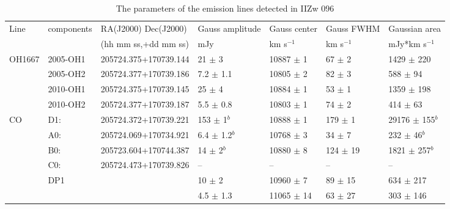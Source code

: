 \documentclass[]{aa} %
\newcommand{\kms}{km s$^{-1}$\xspace}
\begin{document}
\begin{table*}
\small
\caption{The parameters of the emission lines detected in IIZw 096}
\label{allline}
\begin{tabular}{lllllll}

\hline\hline
Line & components & RA(J2000)  Dec(J2000)       & Gauss amplitude   & Gauss center      & Gauss FWHM       & Gaussian area       \\
 &            & (hh mm ss,+dd mm ss)        & mJy               & \kms              & \kms             & mJy*\kms       \\
  \hline
OH1667
 & 2005-OH1   & 205724.375+170739.144  &  21 $\pm$ 3     & 10887 $\pm$ 1   & 67 $\pm$ 2     & 1429 $\pm$ 220      \\
 & 2005-OH2   & 205724.377+170739.186  &  7.2 $\pm$ 1.1     & 10805 $\pm$ 2  & 82 $\pm$ 3    & 588 $\pm$ 94     \\
 & 2010-OH1   & 205724.375+170739.145  &  25 $\pm$ 4     & 10884 $\pm$ 1   & 53 $\pm$ 1    & 1359 $\pm$ 198     \\
 & 2010-OH2   & 205724.377+170739.187  &  5.5 $\pm$ 0.8     & 10803 $\pm$ 1  & 74 $\pm$ 2    & 414 $\pm$ 63     \\
  \hline
CO
& D1:          & 205724.372+170739.221  & 153 $\pm$ 1$^{b}$    & 10888 $\pm$ 1    & 179 $\pm$ 1    & 29176 $\pm$ 155$^{b}$   \\
&A0:           & 205724.069+170734.921  & 6.4 $\pm$ 1.2$^{b}$    & 10768 $\pm$ 3    & 34 $\pm$ 7    & 232 $\pm$ 46$^{b}$    \\
&B0:           & 205723.604+170744.387  & 14 $\pm$ 2$^{b}$    & 10880 $\pm$ 8    & 124 $\pm$ 19   & 1821 $\pm$ 257$^{b}$   \\
&C0:           & 205724.473+170739.826  & --                 & --                   & --                 & --                   \\
& DP1       &        & 10 $\pm$ 2         & 10960 $\pm$ 7    & 89 $\pm$ 15      & 634 $\pm$ 217     \\   %
 &     &                & 4.5 $\pm$ 1.3         & 11065 $\pm$ 14   & 63 $\pm$ 27      & 303 $\pm$ 146     \\   %

\end{tabular}
\end{table*}
\end{document}
